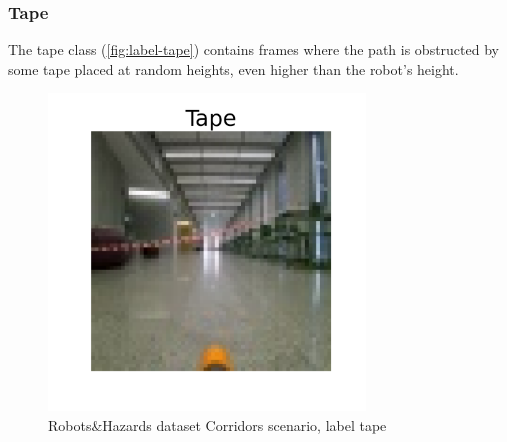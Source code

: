         \subsubsection*{Tape}
            The tape class (\autoref{fig:label-tape}) contains frames where the path is obstructed by some tape placed at random heights, even higher than the robot's height.
            \begin{figure}[H]
                \centering
                \centerline{\includegraphics[width=0.75\textwidth]{img/labels/tape.png}}
                \caption{Robots\&Hazards dataset Corridors scenario, label tape}
                \label{fig:label-tape}
            \end{figure} 

